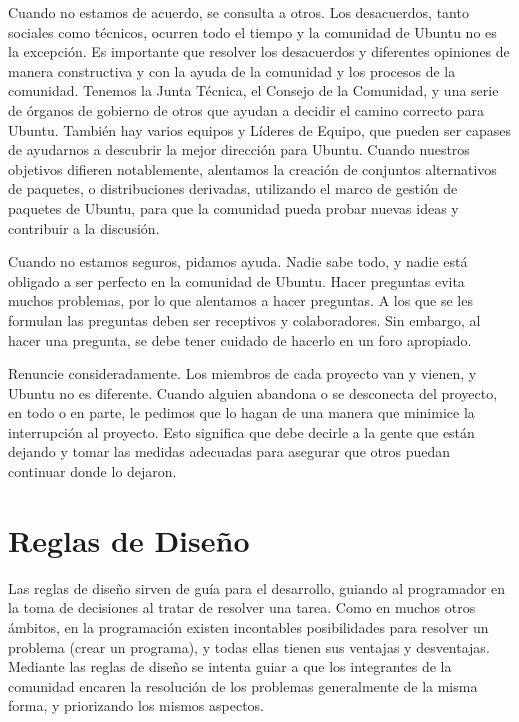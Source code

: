 {Cuando no estamos de acuerdo, se consulta a otros. Los desacuerdos, tanto sociales como técnicos, ocurren todo el tiempo y la comunidad de Ubuntu no es la excepción. Es importante que resolver los desacuerdos y diferentes opiniones de manera constructiva y con la ayuda de la comunidad y los procesos de la comunidad. Tenemos la Junta Técnica, el Consejo de la Comunidad, y una serie de órganos de gobierno de otros que ayudan a decidir el camino correcto para Ubuntu. También hay varios equipos y Líderes de Equipo, que pueden ser capases de ayudarnos a descubrir la mejor dirección para Ubuntu. Cuando nuestros objetivos difieren notablemente, alentamos la creación de conjuntos alternativos de paquetes, o distribuciones derivadas, utilizando el marco de gestión de paquetes de Ubuntu, para que la comunidad pueda probar nuevas ideas y contribuir a la discusión.

Cuando no estamos seguros, pidamos ayuda. Nadie sabe todo, y nadie está obligado a ser perfecto en la comunidad de Ubuntu. Hacer preguntas evita muchos problemas, por lo que alentamos a hacer preguntas. A los que se les formulan las preguntas deben ser receptivos y colaboradores. Sin embargo, al hacer una pregunta, se debe tener cuidado de hacerlo en un foro apropiado.

Renuncie consideradamente. Los miembros de cada proyecto van y vienen, y Ubuntu no es diferente. Cuando alguien abandona o se desconecta del proyecto, en todo o en parte, le pedimos que lo hagan de una manera que minimice la interrupción al proyecto. Esto significa que debe decirle a la gente que están dejando y tomar las medidas adecuadas para asegurar que otros puedan continuar donde lo dejaron.}

\section{Reglas de Diseño}
{Las reglas de diseño sirven de guía para el desarrollo, guiando al programador en la toma de decisiones al tratar de resolver una tarea. Como en muchos otros ámbitos, en la programación existen incontables posibilidades para resolver un problema (crear un programa), y todas ellas tienen sus ventajas y desventajas. Mediante las reglas de diseño se intenta guiar a que los integrantes de la comunidad encaren la resolución de los problemas generalmente de la misma forma, y priorizando los mismos aspectos.}

